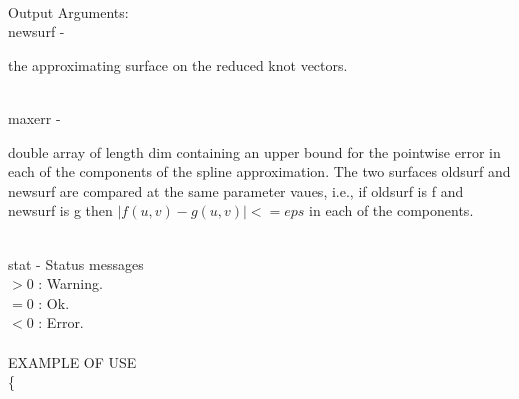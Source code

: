 \\
	\>Output Arguments:\\
        \>\>    {\fov newsurf}\> - \>  \begin{minipg2}
                     the approximating surface on the reduced knot vectors.
                               \end{minipg2}\\[0.8ex]
        \>\>    {\fov maxerr}\> - \>  \begin{minipg2}
                     double array of length dim containing an upper
		         bound for the pointwise error in each of the
		         components of the spline approximation. The two
                        surfaces oldsurf and newsurf are compared at the
                        same parameter vaues, i.e., if oldsurf is f and
                        newsurf is g then
                              $|f(u,v)-g(u,v)| <= eps$
                        in each of the components.
                               \end{minipg2}\\[0.8ex]
        \>\>    {\fov stat}     \> - \> Status messages\\
                \>\>\>\>\>              $> 0$   : Warning.\\
                \>\>\>\>\>              $= 0$   : Ok.\\
                \>\>\>\>\>              $< 0$   : Error.\\
\\
EXAMPLE OF USE\\
		\>      \{ \\

